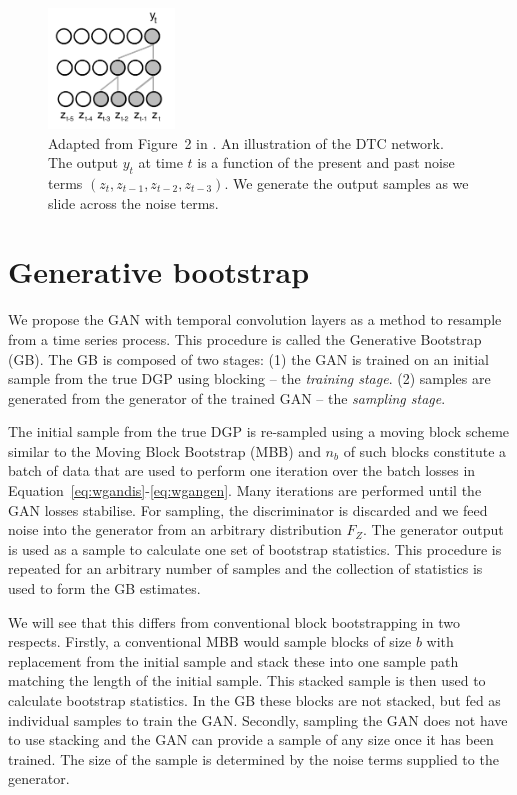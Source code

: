 \documentclass[12pt]{article}
\begin{document}
\begin{figure}\centering
\includegraphics[width=0.3\textwidth]{tcn.pdf}
\caption{Adapted from Figure~2 in \citep{oord2016wavenet}. An illustration of the DTC network. The output $y_t$ at time $t$ is a function of the present and past noise terms $(z_t, z_{t-1}, z_{t-2}, z_{t-3})$. We generate the output samples as we slide across the noise terms.}
\label{fig:dtc}
\end{figure}

\section{Generative bootstrap}\label{sec:genbootstrap}
We propose the GAN with temporal convolution layers as a method to resample from a time series process. This procedure is called the Generative Bootstrap (GB). The GB is composed of two stages: (1) the GAN is trained on an initial sample from the true DGP using blocking -- the \emph{training stage}. (2) samples are generated from the generator of the trained GAN -- the \emph{sampling stage}.

The initial sample from the true DGP is re-sampled using a moving block scheme similar to the Moving Block Bootstrap (MBB) \citep{kunsch1989jackknife,liu1992moving} and $n_b$ of such blocks constitute a batch of data that are used to perform one iteration over the batch losses in Equation~\ref{eq:wgandis}-\ref{eq:wgangen}. Many iterations are performed until the GAN losses stabilise. For sampling, the discriminator is discarded and we feed noise into the generator from an arbitrary distribution $F_Z$. The generator output is used as a sample to calculate one set of bootstrap statistics. This procedure is repeated for an arbitrary number of samples and the collection of statistics is used to form the GB estimates.

We will see that this differs from conventional block bootstrapping in two respects. Firstly, a conventional MBB would sample blocks of size $b$ with replacement from the initial sample and stack these into one sample path matching the length of the initial sample. This stacked sample is then used to calculate bootstrap statistics. In the GB these blocks are not stacked, but fed as individual samples to train the GAN. Secondly, sampling the GAN does not have to use stacking and the GAN can provide a sample of any size once it has been trained. The size of the sample is determined by the noise terms supplied to the generator. 
\end{document}
